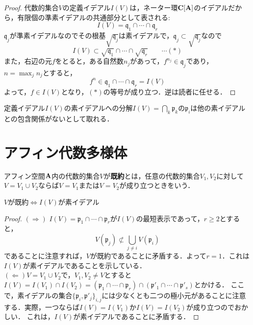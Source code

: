 \documentclass{myclass}
\begin{document}
\begin{proof}
  代数的集合$V$の定義イデアル$I(V)$は，ネーター環$\mathbf{C}[\mathbf{A}]$のイデアルだから，有限個の準素イデアルの共通部分として表される:
  \begin{equation*}
    I(V) = \mathfrak{q}_1\cap \cdots\cap \mathfrak{q}_r
  \end{equation*}
  $\mathfrak{q}_j$が準素イデアルなのでその根基$\sqrt{\mathfrak{q}_j}$は素イデアルで，$\mathfrak{q}_j\subset \sqrt{\mathfrak{q}_j}$なので
  \begin{equation*}
    I(V) \subset \sqrt{\mathfrak{q}_1}\cap \cdots \cap \sqrt{\mathfrak{q}_r}\qquad \cdots (*)
  \end{equation*}
  また，右辺の元$f$をとると，ある自然数$n_j$があって，$f^{n_j} \in \mathfrak{q}_j$であり，$n = \max_j n_j$とすると，
  \begin{equation*}
    f^n \in \mathfrak{q}_1\cap \cdots \cap \mathfrak{q}_r = I(V)
  \end{equation*}
  よって，$f\in I(V)$となり，$(*)$の等号が成り立つ．逆は読者に任せる．
\end{proof}

\begin{remark}
  定義イデアル$I(V)$の素イデアルへの分解$I(V) = \bigcap_k \mathfrak{p}_k$の$\mathfrak{p}_i$は他の素イデアルとの包含関係がないとして取れる． 
\end{remark}


\section{アフィン代数多様体}

\begin{definition}
  アフィン空間$\mathbf{A}$内の代数的集合$V$が\textbf{既約}とは，任意の代数的集合$V_1,V_2$に対して$V = V_1\cup V_2$ならば$V=V_1$または$V=V_2$が成り立つときをいう．
\end{definition}

\begin{proposition}
  $V$が既約$\Leftrightarrow$$I(V)$が素イデアル
\end{proposition}
\begin{proof}
  $(\Rightarrow)$
  $I(V) = \mathfrak{p}_1\cap \cdots \cap \mathfrak{p}_r$が$I(V)$の最短表示であって，$r\geq 2$とすると，
  \begin{equation*}
    V(\mathfrak{p}_j) \not \subset \bigcup_{j\neq i}V(\mathfrak{p}_i)
  \end{equation*}
  であることに注意すれば，$V$が既約であることに矛盾する．よって$r=1$．これは$I(V)$が素イデアルであることを示している．\\
  $(\Leftarrow)$$V=V_1\cup V_2$で，$V_1,V_2\neq V$とすると$I(V) = I(V_1)\cap I(V_2) = (\mathfrak{p}_1\cap \cdots \cap \mathfrak{p}_r)\cap (\mathfrak{p}'_1 \cap \cdots \cap \mathfrak{p}'_s)$とかける．
  ここで，素イデアルの集合$\{\mathfrak{p}_i,\mathfrak{p}'_j\}_{i,j}$には少なくとも二つの極小元があることに注意する．実際，一つならば$I(V) = I(V_1)$か$I(V) = I(V_2)$が成り立つのでおかしい．
  これは，$I(V)$が素イデアルであることに矛盾する．
\end{proof}



\backmatter

\printindex



\end{document}
